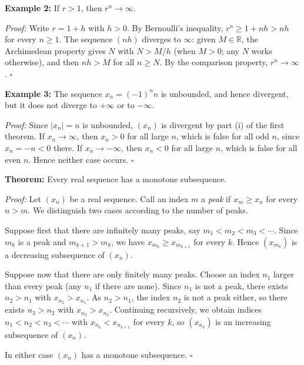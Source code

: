 \documentclass[a4paper,11pt,abstracton]{scrartcl}
\newcommand{\RR}{\mathbb{R}}
\theoremstyle{dotlessP}
\theoremstyle{dotlessS}
\theoremstyle{remark}
\theoremstyle{definition}
\begin{document}
\begin{example_box}
\textbf{Example 2:} If $r>1$, then $r^n\rightarrow\infty$.

\textit{Proof:}
Write $r=1+h$ with $h>0$. By Bernoulli's inequality, $r^n\ge1+nh>nh$ for every $n\ge1$. The sequence $(nh)$ diverges to $\infty$: given $M\in\RR$, the Archimedean property gives $N$ with $N>M/h$ (when $M>0$; any $N$ works otherwise), and then $nh>M$ for all $n\ge N$. By the comparison property, $r^n\rightarrow\infty$.
\hfill$\square$
\end{example_box}

\begin{example_box}
\textbf{Example 3:} The sequence $x_n=(-1)^nn$ is unbounded, and hence divergent, but it does not diverge to $+\infty$ or to $-\infty$.

\textit{Proof:}
Since $|x_n|=n$ is unbounded, $(x_n)$ is divergent by part (i) of the first theorem. If $x_n\rightarrow\infty$, then $x_n>0$ for all large $n$, which is false for all odd $n$, since $x_n=-n<0$ there. If $x_n\rightarrow-\infty$, then $x_n<0$ for all large $n$, which is false for all even $n$. Hence neither case occurs.
\hfill$\square$
\end{example_box}

\begin{problem_box}
\textbf{Theorem:}
Every real sequence has a monotone subsequence.
\end{problem_box}

\begin{claim_box}
\textit{Proof:}
Let $(x_n)$ be a real sequence. Call an index $m$ a \emph{peak} if $x_m\ge x_n$ for every $n>m$. We distinguish two cases according to the number of peaks.

Suppose first that there are infinitely many peaks, say $m_1<m_2<m_3<\cdots$. Since $m_k$ is a peak and $m_{k+1}>m_k$, we have $x_{m_k}\ge x_{m_{k+1}}$ for every $k$. Hence $(x_{m_k})$ is a decreasing subsequence of $(x_n)$.

Suppose now that there are only finitely many peaks. Choose an index $n_1$ larger than every peak (any $n_1$ if there are none). Since $n_1$ is not a peak, there exists $n_2>n_1$ with $x_{n_2}>x_{n_1}$. As $n_2>n_1$, the index $n_2$ is not a peak either, so there exists $n_3>n_2$ with $x_{n_3}>x_{n_2}$. Continuing recursively, we obtain indices $n_1<n_2<n_3<\cdots$ with $x_{n_k}<x_{n_{k+1}}$ for every $k$, so $(x_{n_k})$ is an increasing subsequence of $(x_n)$.

In either case $(x_n)$ has a monotone subsequence.
\hfill$\square$
\end{claim_box}
\end{document}
